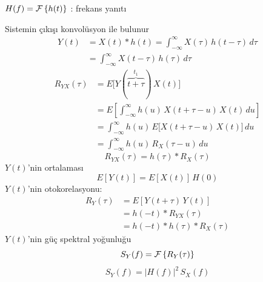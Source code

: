 \documentclass[11pt,a4paper]{article}
\begin{document}
$H(f)=\mathcal{F}\left\{h(t)\right\}$ : frekans yanıtı
\begin{center}
\end{center}
Sistemin çıkışı konvolüsyon ile bulunur
\begin{align*}
  Y(t) &= X(t)*h(t)=\int_{-\infty}^{\infty}X(\tau)\,h(t-\tau)\,d\tau\\
  &= \int_{-\infty}^{\infty}X(t-\tau)\,h(\tau)\,d\tau
\end{align*}
\begin{align*}
  R_{YX}(\tau) &= E\big[Y(\overbrace{t+\tau}^{t_1})\,X(t)\big]\\
  &= E\left[\int_{-\infty}^{\infty}h(u)\,X(t+\tau-u)\,X(t)\,du\right]\\
  &= \int_{-\infty}^{\infty}h(u)\,E\big[X(t+\tau-u)\,X(t)\big]\,du\\
  &= \int_{-\infty}^{\infty}h(u)\,R_X(\tau-u)\,du
\end{align*}
\[ R_{YX}(\tau)=h(\tau)*R_X(\tau) \]
$Y(t)$'nin ortalaması
\[ E[Y(t)]=E[X(t)]\,H(0) \]
$Y(t)$'nin otokorelasyonu:
\begin{align*}
  R_Y(\tau) &= E[Y(t+\tau)\,Y(t)]\\
  &= h(-t)*R_{YX}(\tau)\\
  &= h(-t)*h(\tau)*R_X(\tau)
\end{align*}
$Y(t)$'nin güç spektral yoğunluğu
\[ S_Y(f)=\mathcal{F}\left\{R_Y(\tau)\right\} \]
\[ S_Y(f)=|H(f)|^2\,S_X(f) \]

\end{document}
